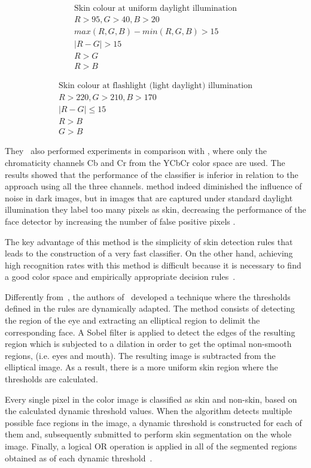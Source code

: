 \begin{align*}
\text{Skin colour at uniform daylight illumination}\\
R > 95, G > 40, B > 20 \\
max(R, G, B) - min(R, G, B) > 15 \\
|R - G| > 15 \\
R > G \\
R > B
\end{align*}

\begin{align*}
\text{Skin colour at flashlight (light daylight) illumination}\\
R > 220, G > 210, B > 170 \\
|R - G| \leq 15 \\
R > B \\
G > B
\end{align*}

They~\citep{kovac:03} also performed experiments in comparison with \citet{hsu:02}, where only the chromaticity channels Cb and Cr from the YCbCr color space are used. The results showed that the performance of the classifier is inferior in relation to the approach using all the three channels. \citet{hsu:02} method indeed diminished the influence of noise in dark images, but in images that are captured under standard daylight illumination they label too many pixels as skin, decreasing the performance of the face detector by increasing the number of false positive pixels \citep{kovac:03}.

The key advantage of this method is the simplicity of skin detection rules that leads to the construction of a very fast classifier. On the other hand, achieving high recognition rates with this method is difficult because it is necessary to find a good color space and empirically appropriate decision rules~\citep{vezhnevets:03}.

Differently from~\citet{kovac:03}, the authors of~\citet{yogarajah:11} developed a technique where the thresholds defined in the rules are dynamically adapted. The method consists of detecting the region of the eye and extracting an elliptical region to delimit the corresponding face. A Sobel filter is applied to detect the edges of the resulting region which is subjected to a dilation in order to get the optimal non-smooth regions, (i.e. eyes and mouth). The resulting image is subtracted from the elliptical image. As a result, there is a more uniform skin region where the thresholds are calculated.

Every single pixel in the color image is classified as skin and non-skin, based on the calculated dynamic threshold values. When the algorithm detects multiple possible face regions in the image, a dynamic threshold is constructed for each of them and, subsequently submitted to perform skin segmentation on the whole image. Finally, a logical OR operation is applied in all of the segmented regions obtained as of each dynamic threshold~\citep{yogarajah:11}.

